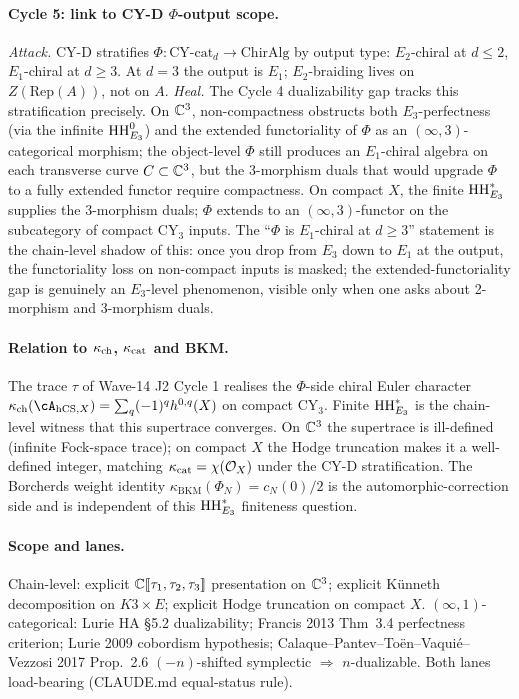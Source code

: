 \paragraph{Cycle 5: link to CY-D $\Phi$-output scope.}
\emph{Attack.} CY-D stratifies $\Phi: \mathrm{CY}\text{-cat}_d \to
\mathrm{ChirAlg}$ by output type: $E_2$-chiral at $d \leq 2$,
$E_1$-chiral at $d \geq 3$. At $d = 3$ the output is $E_1$;
$E_2$-braiding lives on $Z(\mathrm{Rep}(A))$, not on $A$.
\emph{Heal.} The Cycle 4 dualizability gap tracks this stratification
precisely. On $\mathbb{C}^3$, non-compactness obstructs both $E_3$-perfectness
(via the infinite $\mathrm{HH}^0_{E_3}$) and the extended functoriality of
$\Phi$ as an $(\infty, 3)$-categorical morphism; the object-level
$\Phi$ still produces an $E_1$-chiral algebra on each transverse
curve $C \subset \mathbb{C}^3$, but the 3-morphism duals that would upgrade
$\Phi$ to a fully extended functor require compactness. On compact
$X$, the finite $\mathrm{HH}^*_{E_3}$ supplies the 3-morphism duals;
$\Phi$ extends to an $(\infty,3)$-functor on the subcategory of
compact CY$_3$ inputs. The ``$\Phi$ is $E_1$-chiral at $d\geq 3$''
statement is the chain-level shadow of this: once you drop from
$E_3$ down to $E_1$ at the output, the functoriality loss on
non-compact inputs is masked; the extended-functoriality gap is
genuinely an $E_3$-level phenomenon, visible only when one asks
about 2-morphism and 3-morphism duals.

\paragraph{Relation to $\kappa_{\mathrm{ch}}$, $\kappa_{\mathrm{cat}}$ and BKM.}
The trace $\tau$ of Wave-14 J2 Cycle 1 realises the $\Phi$-side
chiral Euler character
$\kch(\cA_{\hCS, X}) = \sum_q (-1)^q h^{0,q}(X)$ on compact CY$_3$.
Finite $\mathrm{HH}^*_{E_3}$ is the chain-level witness that this supertrace
converges. On $\mathbb{C}^3$ the supertrace is ill-defined (infinite
Fock-space trace); on compact $X$ the Hodge truncation makes it a
well-defined integer, matching $\kappa_{\mathrm{cat}} = \chi(\mathcal{O}_X)$ under the
CY-D stratification. The Borcherds weight identity
$\kappa_{\mathrm{BKM}}(\Phi_N) = c_N(0)/2$ is the
automorphic-correction side and is independent of this
$\mathrm{HH}^*_{E_3}$ finiteness question.

\paragraph{Scope and lanes.}
Chain-level: explicit $\mathbb{C}[\![\tau_1,\tau_2,\tau_3]\!]$ presentation
on $\mathbb{C}^3$; explicit K\"unneth decomposition on $K3 \times E$;
explicit Hodge truncation on compact $X$. $(\infty,1)$-categorical:
Lurie HA \S5.2 dualizability; Francis 2013 Thm~3.4
perfectness criterion; Lurie 2009 cobordism hypothesis;
Calaque--Pantev--Toën--Vaquié--Vezzosi 2017 Prop.~2.6
$(-n)$-shifted symplectic $\Rightarrow$ $n$-dualizable. Both lanes
load-bearing (CLAUDE.md equal-status rule).

